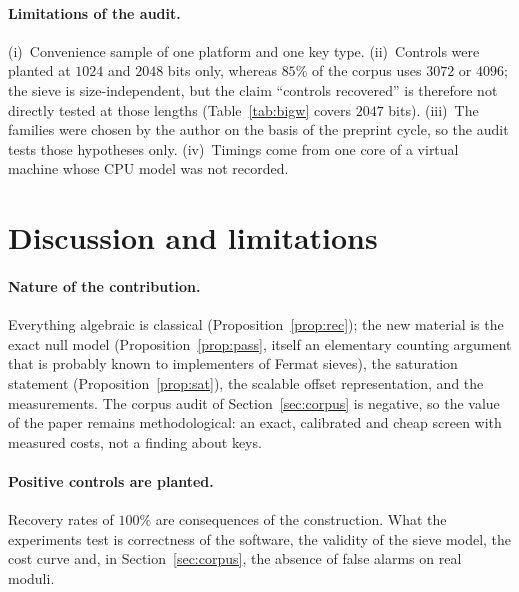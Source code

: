 \documentclass[11pt,a4paper]{article}
\begin{document}
\paragraph{Limitations of the audit.} (i)~Convenience sample of one platform and one key type. (ii)~Controls were planted at $1024$ and $2048$ bits only, whereas $85\%$ of the corpus uses $3072$ or $4096$; the sieve is size-independent, but the claim ``controls recovered'' is therefore not directly tested at those lengths (Table~\ref{tab:bigw} covers $2047$ bits). (iii)~The families were chosen by the author on the basis of the preprint cycle, so the audit tests those hypotheses only. (iv)~Timings come from one core of a virtual machine whose CPU model was not recorded.

\section{Discussion and limitations}
\paragraph{Nature of the contribution.} Everything algebraic is classical (Proposition~\ref{prop:rec}); the new material is the exact null model (Proposition~\ref{prop:pass}, itself an elementary counting argument that is probably known to implementers of Fermat sieves), the saturation statement (Proposition~\ref{prop:sat}), the scalable offset representation, and the measurements. The corpus audit of Section~\ref{sec:corpus} is negative, so the value of the paper remains methodological: an exact, calibrated and cheap screen with measured costs, not a finding about keys.

\paragraph{Positive controls are planted.} Recovery rates of $100\%$ are consequences of the construction. What the experiments test is correctness of the software, the validity of the sieve model, the cost curve and, in Section~\ref{sec:corpus}, the absence of false alarms on real moduli.
\end{document}
